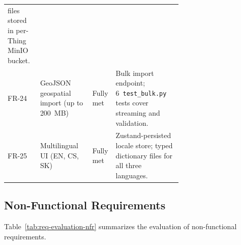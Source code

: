 \begin{landscape}
{\begin{longtable}{l p{0.30\linewidth} l p{0.38\linewidth}}
          files stored in per-Thing MinIO bucket. \\[3pt]
  FR-24 & GeoJSON geospatial import (up to 200~MB)
        & Fully met
        & Bulk import endpoint; 6~\texttt{test\_bulk.py} tests cover streaming
          and validation. \\[3pt]
  FR-25 & Multilingual UI (EN, CS, SK)
        & Fully met
        & Zustand-persisted locale store; typed dictionary files for all three
          languages. \\
\end{longtable}
}
\end{landscape}

\begin{landscape}
\subsection{Non-Functional Requirements}
\label{sec:test-requirements-nonfunctional}

Table~\ref{tab:req-evaluation-nfr} summarizes the evaluation of non-functional requirements.


\end{landscape}
